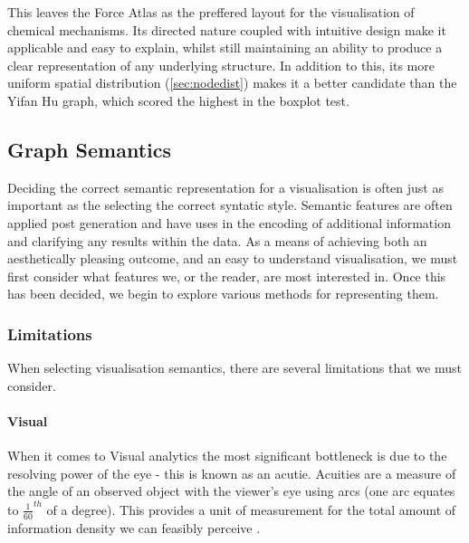 This leaves the Force Atlas as the preffered layout for the visualisation of chemical mechanisms. Its directed nature coupled with intuitive design make it applicable and easy to explain, whilst still maintaining an ability to produce a clear representation of any underlying structure. In addition to this, its more uniform spatial distribution (\autoref{sec:nodedist}) makes it a better candidate than the Yifan Hu graph, which scored the highest in the boxplot test. 













\subsection{Graph Semantics}\label{semantic}

Deciding the correct semantic representation for a visualisation is often just as important as the selecting the correct syntatic style. Semantic features are often applied post generation \citep{aestheticsgraphvis} and have uses in the encoding of additional information and clarifying any results within the data. As a means of achieving both an aesthetically pleasing outcome, and an easy to understand visualisation, we must first consider what features we, or the reader, are most interested in. Once this has been decided, we begin to explore various methods for representing them. 

\subsubsection{Limitations}

When selecting visualisation semantics, there are several limitations that we must consider. 

\paragraph*{Visual}
When it comes to Visual analytics the most significant bottleneck is due to the resolving power of the eye - this is known as an acutie. Acuities are a measure of the angle of an observed object with the viewer's eye using arcs (one arc equates to $\frac{1}{60}^{th}$ of a degree). This provides a unit of measurement for the total amount of information density we can feasibly perceive \citep{ware}. 

